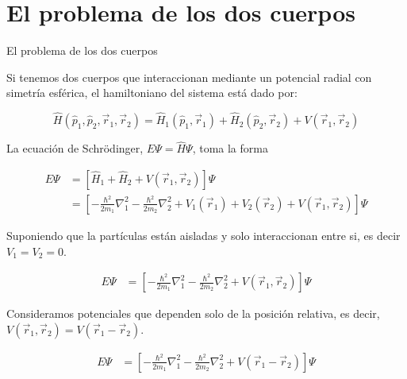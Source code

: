 \section{El problema de los dos cuerpos}

\begin{frame}{El problema de los dos cuerpos}

    Si tenemos dos cuerpos que interaccionan mediante un potencial radial con simetría esférica, el hamiltoniano del sistema está dado por:
        
    \begin{equation*}
        \hat{H} (\hat{p}_{1}, \hat{p}_{2}, \Vec{r}_{1}, \Vec{r}_{2}) = \hat{H}_{1} (\hat{p}_{1}, \Vec{r}_{1} ) + \hat{H}_{2} ( \hat{p}_{2}, \Vec{r}_{2}) + V(\Vec{r}_{1}, \Vec{r}_{2})
    \end{equation*}
        
    La ecuación de Schr\"odinger, $E \Psi=\hat{H} \Psi $, toma la forma \cite{de2014introduccion}

    \begin{align*}
        E \Psi &= \left[ \hat{H}_{1}  + \hat{H}_{2}  + V(\Vec{r}_{1}, \Vec{r}_{2}) \right] \Psi \\
        &=  \left[ - \frac{\hbar^2}{2m_{1}} \nabla^{2}_{1} - \frac{\hbar^2}{2m_{2}} \nabla^{2}_{2}  + V_{1} (\Vec{r}_1)   + V_{2} (\Vec{r}_2)  + V(\Vec{r}_{1}, \Vec{r}_{2}) \right] \Psi
    \end{align*}
    
\end{frame}

\begin{frame}{}

    Suponiendo que la partículas están aisladas y solo interaccionan entre si, es decir $V_{1}=V_{2}=0$.

    \begin{align*}
        E \Psi &=  \left[ - \frac{\hbar^2}{2m_{1}} \nabla^{2}_{1} - \frac{\hbar^2}{2m_{2}} \nabla^{2}_{2} + V(\Vec{r}_{1}, \Vec{r}_{2}) \right] \Psi
    \end{align*}
    
    Consideramos potenciales que dependen solo de la posición relativa, es decir, $V(\Vec{r}_{1}, \Vec{r}_{2}) = V(\Vec{r}_{1} - \Vec{r}_{2})$.
    
    \begin{align*}
        E \Psi &=  \left[ - \frac{\hbar^2}{2m_{1}} \nabla^{2}_{1} - \frac{\hbar^2}{2m_{2}} \nabla^{2}_{2} + V(\Vec{r}_{1} - \Vec{r}_{2}) \right] \Psi
    \end{align*}
    
\end{frame}


